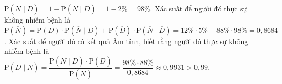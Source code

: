 \begin{ex}
{\begin{itemchoice}
			$\mathrm{P}(\overline{N} \mid \overline{D})=1-\mathrm{P}(N \mid \overline{D})=1-2\%=98\%$.
			\itemch 
			Xác suất để người đó thực sự không nhiễm bệnh là\\
			$\mathrm{P}(\overline{N})=\mathrm{P}(D) \cdot \mathrm{P}(\overline{N} \mid  D)+\mathrm{P}(\overline{D}) \cdot \mathrm{P}(\overline{N} \mid \overline{D})=12\% \cdot 5\%+88\% \cdot 98\%=0{,}8684$.
			\itemch 
			Xác suất để người đó có kết quả Âm tính, biết rằng người đó thực sự không nhiễm bệnh là\\
			$\mathrm{P}(\overline{D} \mid \overline{N})=\dfrac{\mathrm{P}(\overline{N} \mid \overline{D}) \cdot \mathrm{P}(\overline{D})}{\mathrm{P}(\overline{N})}=\dfrac{98\% \cdot 88\%}{0{,}8684} \approx 0{,}9931>0{,}99$.
		\end{itemchoice}
	}
\end{ex}

